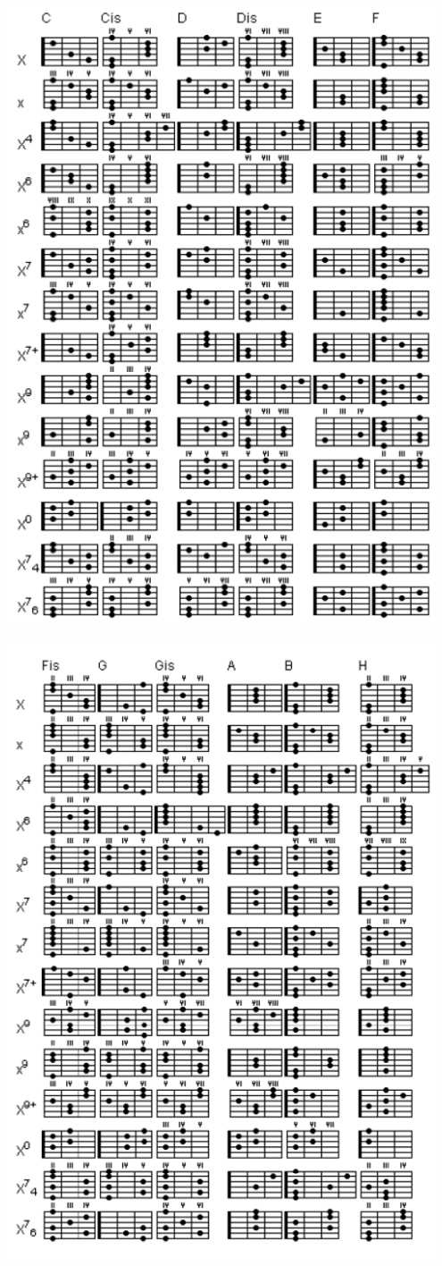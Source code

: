 \documentclass[a5paper, 10pt]{book}
\begin{document}
\newpage
~\\
\includegraphics[width=0.95\textwidth, center]{chordchart1.png}\\
\newpage
~\\
\includegraphics[width=0.95\textwidth, center]{chordchart2.png}\\
\end{document}
